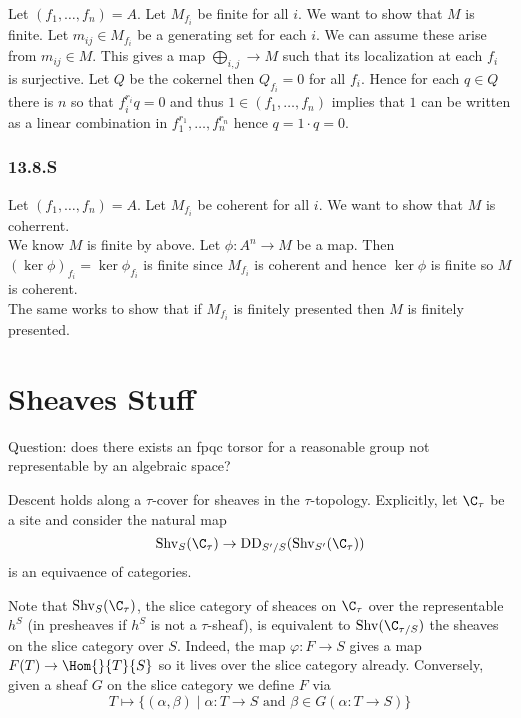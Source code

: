 \documentclass[12pt]{article}
\theoremstyle{plain}
\begin{document}
Let $(f_1, \dots, f_n) = A$. Let $M_{f_i}$ be finite for all $i$. We want to show that $M$ is finite. Let $m_{ij} \in M_{f_i}$ be a generating set for each $i$. We can assume these arise from $m_{ij} \in M$. This gives a map $\bigoplus_{i,j} \to M$ such that its localization at each $f_i$ is surjective. Let $Q$ be the cokernel then $Q_{f_i} = 0$ for all $f_i$. Hence for each $q \in Q$ there is $n$ so that $f_i^{r_i} q = 0$ and thus $1 \in (f_1, \dots, f_n)$ implies that $1$ can be written as a linear combination in $f_1^{r_1}, \dots, f_n^{r_n}$ hence $q = 1 \cdot q = 0$.


\subsubsection{13.8.S}

Let $(f_1, \dots, f_n) = A$. Let $M_{f_i}$ be coherent for all $i$. We want to show that $M$ is coherrent. 
\bigskip\\
We know $M$ is finite by above. Let $\phi : A^n \to M$ be a map. Then $(\ker{\phi})_{f_i} = \ker{\phi_{f_i}}$ is finite since $M_{f_i}$ is coherent and hence $\ker{\phi}$ is finite so $M$ is coherent.
\bigskip\\
The same works to show that if $M_{f_i}$ is finitely presented then $M$ is finitely presented. 
 
 
 
 
\section{Sheaves Stuff}

Question: does there exists an fpqc torsor for a reasonable group not representable by an algebraic space?

\newcommand{\Shv}{\mathrm{Shv}}

\begin{lemma}
Descent holds along a $\tau$-cover for sheaves in the $\tau$-topology. Explicitly, let $\C_\tau$ be a site and consider the natural map
\[ \Shv_S(\C_\tau) \to \mathrm{DD}_{S'/S}(\Shv_{S'}(\C_\tau)) \]
is an equivaence of categories. 
\end{lemma}

\begin{rmk}
Note that $\Shv_S(\C_\tau)$, the slice category of sheaces on $\C_\tau$ over the representable $h^S$ (in presheaves if $h^S$ is not a $\tau$-sheaf), is equivalent to $\Shv(\C_{\tau / S})$ the sheaves on the slice category over $S$. Indeed, the map $\varphi : F \to S$ gives a map $F(T) \to \Hom{}{T}{S}$ so it lives over the slice category already. Conversely, given a sheaf $G$ on the slice category we define $F$ via 
\[ T \mapsto \{ (\alpha, \beta) \mid \alpha : T \to S \text{ and } \beta \in G(\alpha : T \to S) \} \]
\end{rmk}
\end{document}
